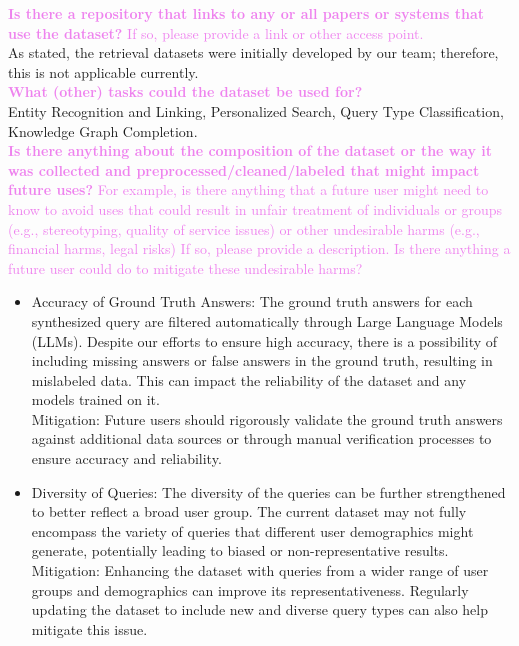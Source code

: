 \documentclass{article}
\newcommand{\sectioncolor}{Violet}
\begin{document}
    \textcolor{\sectioncolor}{\textbf{
    Is there a repository that links to any or all papers or systems that use the dataset?
    }
    If so, please provide a link or other access point.
    } \\
    As stated, the retrieval datasets were initially developed by our team; therefore, this is not applicable currently. \\

    \textcolor{\sectioncolor}{\textbf{
    What (other) tasks could the dataset be used for?
    }
    } \\
    Entity Recognition and Linking, Personalized Search, Query Type Classification, Knowledge Graph Completion.  \\

    \textcolor{\sectioncolor}{\textbf{
    Is there anything about the composition of the dataset or the way it was
    collected and preprocessed/cleaned/labeled that might impact future uses?
    }
    For example, is there anything that a future user might need to know to
    avoid uses that could result in unfair treatment of individuals or groups
    (e.g., stereotyping, quality of service issues) or other undesirable harms
    (e.g., financial harms, legal risks) If so, please provide a description.
    Is there anything a future user could do to mitigate these undesirable
    harms?
    } \\
    \begin{itemize}[leftmargin=*]
        \item Accuracy of Ground Truth Answers: The ground truth answers for each synthesized query are filtered automatically through Large Language Models (LLMs). Despite our efforts to ensure high accuracy, there is a possibility of including missing answers or false answers in the ground truth, resulting in mislabeled data. This can impact the reliability of the dataset and any models trained on it.\vspace{3pt}\\
        Mitigation: Future users should rigorously validate the ground truth answers against additional data sources or through manual verification processes to ensure accuracy and reliability.

        \item Diversity of Queries: The diversity of the queries can be further strengthened to better reflect a broad user group. The current dataset may not fully encompass the variety of queries that different user demographics might generate, potentially leading to biased or non-representative results.\vspace{3pt}\\
        Mitigation: Enhancing the dataset with queries from a wider range of user groups and demographics can improve its representativeness. Regularly updating the dataset to include new and diverse query types can also help mitigate this issue.
        
    \end{itemize}
\end{document}
